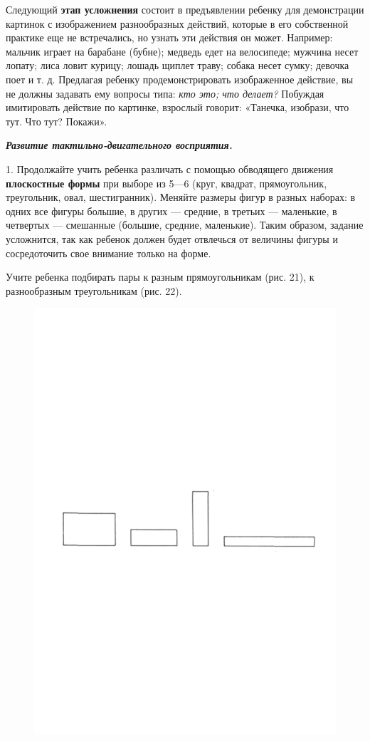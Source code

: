 \documentclass[a5paper]{book}
\renewcommand{\emph}[1]{\textit{#1}}
\begin{document}
Следующий \textbf{этап усложнения} состоит в предъявлении ребенку для
демонстрации картинок с изображением разнообразных действий, которые в
его собственной практике еще не встречались, но узнать эти действия он
может. Например: мальчик играет на барабане (бубне); медведь едет на
велосипеде; мужчина несет лопату; лиса ловит курицу; лошадь щиплет
траву; собака несет сумку; девочка поет и т. д. Предлагая ребенку
продемонстрировать изображенное действие, вы не должны задавать ему
вопросы типа: \emph{кто это; что делает?} Побуждая имитировать действие
по картинке, взрослый говорит: «Танечка, изобрази, что тут. Что тут?
Покажи».

\emph{\textbf{Развитие тактильно-двигательного восприятия.}}

1. Продолжайте учить ребенка различать с помощью обводящего движения
\textbf{плоскостные формы} при выборе из 5---6 (круг, квадрат,
прямоугольник, треугольник, овал, шестигранник). Меняйте размеры фигур в
разных наборах: в одних все фигуры большие, в других --- средние, в
третьих --- маленькие, в четвертых --- смешанные (большие, средние,
маленькие). Таким образом, задание усложнится, так как ребенок должен
будет отвлечься от величины фигуры и сосредоточить свое внимание только
на форме.

Учите ребенка подбирать пары к разным прямоугольникам (рис. 21), к
разнообразным треугольникам (рис. 22).

\begin{figure}
\centering
\includegraphics[width=\linewidth]{media/media/image18.png}
\end{figure}
\end{document}
